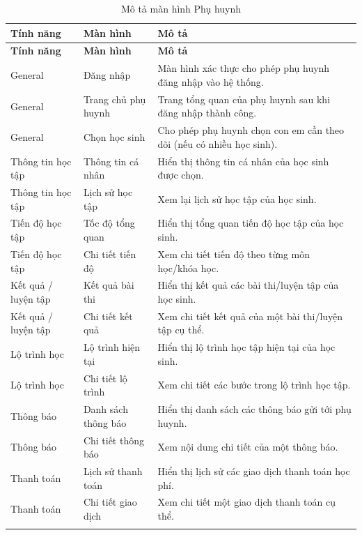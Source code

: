 \documentclass[11pt,a4paper]{article}
\begin{document}
\begin{longtable}{|L{3.0cm}|L{3.6cm}|L{8.0cm}|}
\hline
{}
\textbf{Tính năng} & \textbf{Màn hình} & \textbf{Mô tả} \\ \hline
\endfirsthead
\hline
{}
\textbf{Tính năng} & \textbf{Màn hình} & \textbf{Mô tả} \\ \hline
\endhead
General & Đăng nhập & Màn hình xác thực cho phép phụ huynh đăng nhập vào hệ thống. \\ \hline
General & Trang chủ phụ huynh & Trang tổng quan của phụ huynh sau khi đăng nhập thành công. \\ \hline
General & Chọn học sinh & Cho phép phụ huynh chọn con em cần theo dõi (nếu có nhiều học sinh). \\ \hline
Thông tin học tập & Thông tin cá nhân & Hiển thị thông tin cá nhân của học sinh được chọn. \\ \hline
Thông tin học tập & Lịch sử học tập & Xem lại lịch sử học tập của học sinh. \\ \hline
Tiến độ học tập & Tốc độ tổng quan & Hiển thị tổng quan tiến độ học tập của học sinh. \\ \hline
Tiến độ học tập & Chi tiết tiến độ & Xem chi tiết tiến độ theo từng môn học/khóa học. \\ \hline
Kết quả / luyện tập & Kết quả bài thi & Hiển thị kết quả các bài thi/luyện tập của học sinh. \\ \hline
Kết quả / luyện tập & Chi tiết kết quả & Xem chi tiết kết quả của một bài thi/luyện tập cụ thể. \\ \hline
Lộ trình học & Lộ trình hiện tại & Hiển thị lộ trình học tập hiện tại của học sinh. \\ \hline
Lộ trình học & Chi tiết lộ trình & Xem chi tiết các bước trong lộ trình học tập. \\ \hline
Thông báo & Danh sách thông báo & Hiển thị danh sách các thông báo gửi tới phụ huynh. \\ \hline
Thông báo & Chi tiết thông báo & Xem nội dung chi tiết của một thông báo. \\ \hline
Thanh toán & Lịch sử thanh toán & Hiển thị lịch sử các giao dịch thanh toán học phí. \\ \hline
Thanh toán & Chi tiết giao dịch & Xem chi tiết một giao dịch thanh toán cụ thể. \\ \hline
\caption{Mô tả màn hình Phụ huynh}
\end{longtable}
\end{document}
